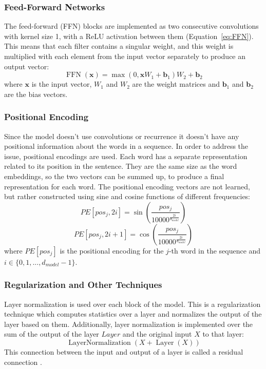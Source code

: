 \documentclass[12pt]{article}
\DeclareMathOperator{\FFN}{FFN}
\DeclareMathOperator{\Layer}{Layer}
\DeclareMathOperator{\LayerNormalization}{LayerNormalization}
\begin{document}
\subsubsection{Feed-Forward Networks} \label{sssec:trf_nn}
The feed-forward (FFN) blocks are implemented as two consecutive convolutions with kernel size 1, with a ReLU activation between them (Equation~\ref{eq:FFN}). This means that each filter contains a singular weight, and this weight is multiplied with each element from the input vector separately to produce an output vector:
\begin{equation} \label{eq:FFN}
\FFN(\bm{x})=\max(0,\bm{x}W_1+\bm{b}_1)W_2+\bm{b}_2
\end{equation}
where \(\bm{x}\) is the input vector, \(W_1\) and \(W_2\) are the weight matrices and \(\bm{b}_1\) and \(\bm{b}_2\) are the bias vectors.

\subsubsection{Positional Encoding} \label{sssec:positional}
Since the model doesn't use convolutions or recurrence it doesn't have any positional information about the words in a sequence. In order to address the issue, positional encodings are used. Each word has a separate representation related to its position in the sentence. They are the same size as the word embeddings, so the two vectors can be summed up, to produce a final representation for each word. The positional encoding vectors are not learned, but rather constructed using sine and cosine functions of different frequencies:
\begin{equation}
PE[pos_j,2i]=\sin\left(\frac{pos_j}{10000^{\frac{2i}{d_{model}}}}\right)
\end{equation}
\begin{equation}
PE[pos_j,2i+1]=\cos\left(\frac{pos_j}{10000^{\frac{2i}{d_{model}}}}\right) 
\end{equation}
where \(PE[pos_j]\) is the positional encoding for the \(j\)-th word in the sequence and \(i \in \{0,1,...,d_{model}-1\}\).

\subsubsection{Regularization and Other Techniques} \label{sssec:regularization}
Layer normalization \cite{Ba:2016} is used over each block of the model. This is a regularization technique which computes statistics over a layer and normalizes the output of the layer based on them. Additionally, layer normalization is implemented over the sum of the output of the layer \(Layer\) and the original input \(X\) to that layer:
\begin{equation}
\LayerNormalization(X+\Layer(X))
\end{equation}
This connection between the input and output of a layer is called a residual connection \cite{He:2016}.
\end{document}
